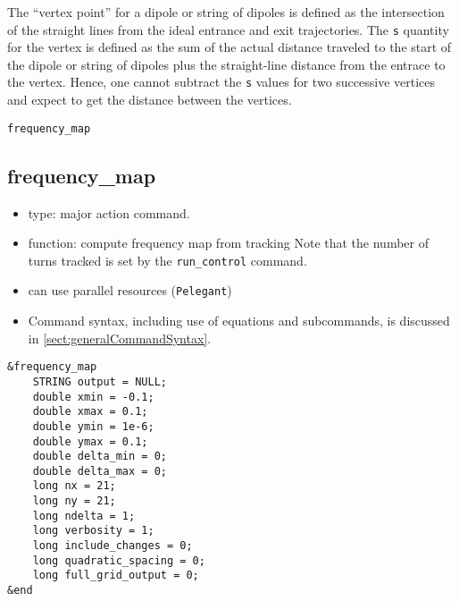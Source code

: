 \documentclass[11pt]{article}
\begin{document}
The ``vertex  point'' for a dipole or string of dipoles is defined as the intersection of the
straight lines from the ideal entrance and exit trajectories. 
The \verb|s| quantity for the vertex is defined as the sum of the actual distance traveled to the
start of the dipole or string of dipoles plus the straight-line distance from the entrace to the
vertex. 
Hence, one cannot subtract the \verb|s| values for two successive vertices and expect to get the
distance between the vertices.

\newpage
\begin{center}{\Large\verb|frequency_map|}\end{center}
\subsection{frequency\_map \label{subsec:frequencymap}}

\begin{itemize}
\item type: major action command.  
\item function: compute frequency map from tracking
      Note that the number of turns tracked is set by the \verb|run_control| command.
\item can use parallel resources (\verb|Pelegant|)
\item Command syntax, including use of equations and subcommands, is discussed in \ref{sect:generalCommandSyntax}.
\end{itemize}

\begin{verbatim}
&frequency_map
    STRING output = NULL;
    double xmin = -0.1;
    double xmax = 0.1;
    double ymin = 1e-6;
    double ymax = 0.1;
    double delta_min = 0;
    double delta_max = 0;
    long nx = 21;
    long ny = 21;
    long ndelta = 1;
    long verbosity = 1;
    long include_changes = 0;
    long quadratic_spacing = 0;
    long full_grid_output = 0;
&end
\end{verbatim}
\end{document}

